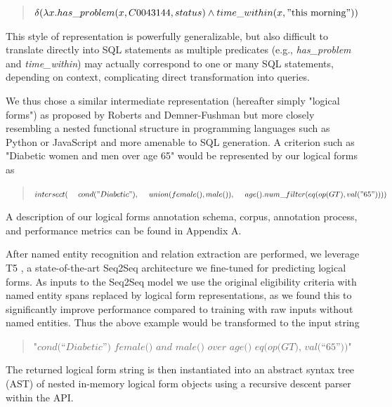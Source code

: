 \documentclass[../main.tex]{subfiles}
\begin{document}
\begin{quote}
    \centering
    $\delta( \lambda x.has\_problem(x, C0043144, status) \wedge time\_within(x, \mathrm{"this\ morning"}))$
\end{quote}

\noindent This style of representation is powerfully generalizable, but also difficult to translate directly into SQL statements as multiple predicates (e.g., \textit{has\_problem} and \textit{time\_within}) may actually correspond to one or many SQL statements, depending on context, complicating direct transformation into queries.

We thus chose a similar intermediate representation (hereafter simply "logical forms") as proposed by Roberts and Demner-Fushman but more closely resembling a nested functional structure in programming languages such as Python or JavaScript and more amenable to SQL generation. A criterion such as "Diabetic women and men over age 65" would be represented by our logical forms as

\begin{quote}
$intersect( \\
    \mathrm{\ \ \ \ }cond("Diabetic"), \\
    \mathrm{\ \ \ \ }union(female(), male()),\\
    \mathrm{\ \ \ \ }age().num\_filter(eq(op(GT), val("65"))) \\
)$
\end{quote}

\noindent A description of our logical forms annotation schema, corpus, annotation process, and performance metrics can be found in Appendix A.

After named entity recognition and relation extraction are performed, we leverage T5 \cite{raffel2020exploring}, a state-of-the-art Seq2Seq architecture we fine-tuned for predicting logical forms. As inputs to the Seq2Seq model we use the original eligibility criteria with named entity spans replaced by logical form representations, as we found this to significantly improve performance compared to training with raw inputs without named entities. Thus the above example would be transformed to the input string

\begin{quote}
    \centering
    $\textit{"cond(“Diabetic”) female() and male() over age() eq(op(GT), val(“65”))"}$
\end{quote}

\noindent The returned logical form string is then instantiated into an abstract syntax tree (AST) of nested in-memory logical form objects using a recursive descent parser \cite{johnstone1998generalised} within the API.
\end{document}
